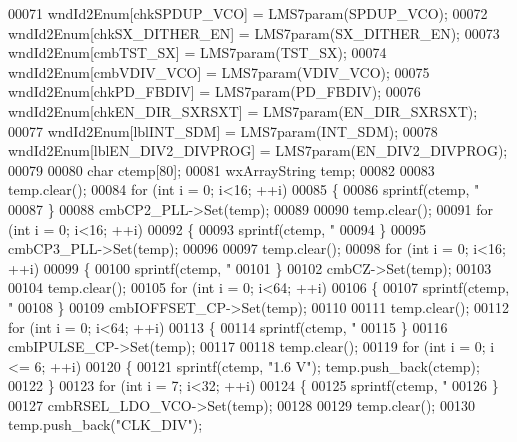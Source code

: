 \begin{DoxyCode}
00071     wndId2Enum[chkSPDUP_VCO] = LMS7param(SPDUP_VCO);
00072     wndId2Enum[chkSX_DITHER_EN] = LMS7param(SX_DITHER_EN);
00073     wndId2Enum[cmbTST_SX] = LMS7param(TST_SX);
00074     wndId2Enum[cmbVDIV_VCO] = LMS7param(VDIV_VCO);
00075     wndId2Enum[chkPD_FBDIV] = LMS7param(PD_FBDIV);
00076     wndId2Enum[chkEN_DIR_SXRSXT] = LMS7param(EN_DIR_SXRSXT);
00077     wndId2Enum[lblINT_SDM] = LMS7param(INT_SDM);
00078     wndId2Enum[lblEN_DIV2_DIVPROG] = LMS7param(EN_DIV2_DIVPROG);
00079 
00080     \textcolor{keywordtype}{char} ctemp[80];
00081     wxArrayString temp;
00082 
00083     temp.clear();
00084     \textcolor{keywordflow}{for} (\textcolor{keywordtype}{int} i = 0; i<16; ++i)
00085     \{
00086         sprintf(ctemp, \textcolor{stringliteral}{"%
00087     \}
00088     cmbCP2_PLL->Set(temp);
00089 
00090     temp.clear();
00091     \textcolor{keywordflow}{for} (\textcolor{keywordtype}{int} i = 0; i<16; ++i)
00092     \{
00093         sprintf(ctemp, \textcolor{stringliteral}{"%
00094     \}
00095     cmbCP3_PLL->Set(temp);
00096 
00097     temp.clear();
00098     \textcolor{keywordflow}{for} (\textcolor{keywordtype}{int} i = 0; i<16; ++i)
00099     \{
00100         sprintf(ctemp, \textcolor{stringliteral}{"%
00101     \}
00102     cmbCZ->Set(temp);
00103 
00104     temp.clear();
00105     \textcolor{keywordflow}{for} (\textcolor{keywordtype}{int} i = 0; i<64; ++i)
00106     \{
00107         sprintf(ctemp, \textcolor{stringliteral}{"%
00108     \}
00109     cmbIOFFSET_CP->Set(temp);
00110 
00111     temp.clear();
00112     \textcolor{keywordflow}{for} (\textcolor{keywordtype}{int} i = 0; i<64; ++i)
00113     \{
00114         sprintf(ctemp, \textcolor{stringliteral}{"%
00115     \}
00116     cmbIPULSE_CP->Set(temp);
00117 
00118     temp.clear();
00119     \textcolor{keywordflow}{for} (\textcolor{keywordtype}{int} i = 0; i <= 6; ++i)
00120     \{
00121         sprintf(ctemp, \textcolor{stringliteral}{"1.6 V"}); temp.push\_back(ctemp);
00122     \}
00123     \textcolor{keywordflow}{for} (\textcolor{keywordtype}{int} i = 7; i<32; ++i)
00124     \{
00125         sprintf(ctemp, \textcolor{stringliteral}{"%
00126     \}
00127     cmbRSEL_LDO_VCO->Set(temp);
00128 
00129     temp.clear();
00130     temp.push\_back(\textcolor{stringliteral}{"CLK\_DIV"});
}}}}}}
\end{DoxyCode}
